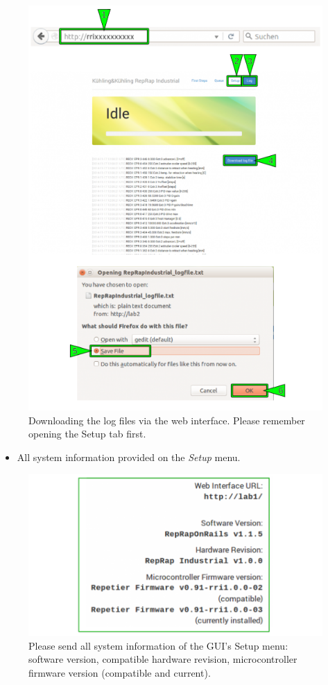 \begin{figure}[H]
  \centering
  \includegraphics[width=.7\linewidth]{./img/wi_v105-v110_logdownload.png}
  \caption{Downloading the log files via the web interface. Please remember opening the Setup tab first.}
\end{figure}

\begin{itemize}
  \item All system information provided on the \emph{Setup} menu. 
\end{itemize}

\begin{figure}[H]
  \centering
  \includegraphics[width=.7\linewidth]{./img/sg_setupmenu_information.png}
  \caption{Please send all system information of the GUI's Setup menu: software version, compatible hardware revision, microcontroller 
           firmware version (compatible and current).}
\end{figure}

